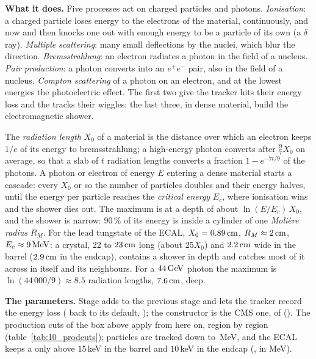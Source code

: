 \textbf{What it does.} Five processes act on charged particles and photons. \emph{Ionisation}: a charged particle
loses energy to the electrons of the material, continuously, and now and then knocks one out with enough energy to
be a particle of its own (a $\delta$ ray). \emph{Multiple scattering}: many small deflections by the nuclei, which
blur the direction. \emph{Bremsstrahlung}: an electron radiates a photon in the field of a nucleus. \emph{Pair
production}: a photon converts into an $e^+e^-$ pair, also in the field of a nucleus. \emph{Compton scattering} of a
photon on an electron, and at the lowest energies the photoelectric effect. The first two give the tracker hits their
energy loss and the tracks their wiggles; the last three, in dense material, build the electromagnetic shower.

\begin{plainwords}
The \emph{radiation length} $X_0$ of a material is the distance over which an electron keeps $1/e$ of its energy to
bremsstrahlung; a high-energy photon converts after $\frac97X_0$ on average, so that a slab of $t$ radiation lengths
converts a fraction $1-e^{-7t/9}$ of the photons. A photon or electron of energy $E$ entering a dense material starts
a cascade: every $X_0$ or so the number of particles doubles and their energy halves, until the energy per
particle reaches the \emph{critical energy} $E_c$, where ionisation wins and the shower dies out. The maximum is
at a depth of about $\ln(E/E_c)\,X_0$, and the shower is narrow: 90\,\% of its energy is inside a cylinder of one
\emph{Moli\`ere radius} $R_M$. For the lead tungstate of the ECAL, $X_0=0.89\,\mathrm{cm}$, $R_M\approx2\,\mathrm{cm}$, $E_c\approx9\,\mathrm{MeV}$:
a crystal, 22 to $23\,\mathrm{cm}$ long (about $25X_0$) and $2.2\,\mathrm{cm}$ wide in the barrel ($2.9\,\mathrm{cm}$ in the endcap), contains a
shower in depth and catches most of it across in itself and its neighbours. For a $44\,\mathrm{GeV}$ photon the maximum is
$\ln(44\,000/9)\approx8.5$ radiation lengths, $7.6\,\mathrm{cm}$, deep.
\end{plainwords}

\textbf{The parameters.} Stage  adds  to the previous stage and lets the
tracker record the energy loss ( back to its default, ); the constructor is the CMS
one,  of  (). The production cuts of the box
above apply from here on, region by region (table~\ref{tab:10_prodcuts}); particles are tracked down to
\,MeV, and the ECAL keeps a  only above $15$\,keV in the barrel and
$10$\,keV in the endcap (, in MeV).

